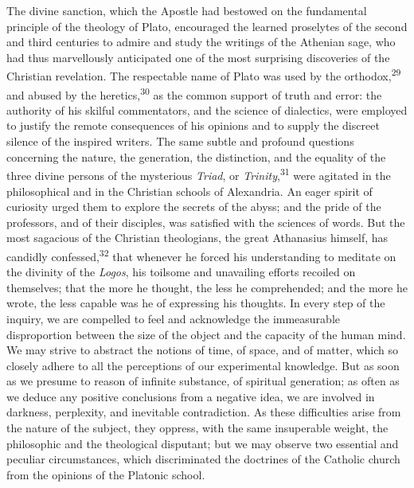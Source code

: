 The divine sanction, which the Apostle had bestowed on the
fundamental principle of the theology of Plato, encouraged the
learned proselytes of the second and third centuries to admire
and study the writings of the Athenian sage, who had thus
marvellously anticipated one of the most surprising discoveries
of the Christian revelation. The respectable name of Plato was
used by the orthodox,\textsuperscript{29} and abused by the heretics,\textsuperscript{30} as the
common support of truth and error: the authority of his skilful
commentators, and the science of dialectics, were employed to
justify the remote consequences of his opinions and to supply the
discreet silence of the inspired writers. The same subtle and
profound questions concerning the nature, the generation, the
distinction, and the equality of the three divine persons of the
mysterious \textit{Triad}, or \textit{Trinity},\textsuperscript{31} were agitated in the
philosophical and in the Christian schools of Alexandria. An
eager spirit of curiosity urged them to explore the secrets of
the abyss; and the pride of the professors, and of their
disciples, was satisfied with the sciences of words. But the most
sagacious of the Christian theologians, the great Athanasius
himself, has candidly confessed,\textsuperscript{32} that whenever he forced his
understanding to meditate on the divinity of the \textit{Logos}, his
toilsome and unavailing efforts recoiled on themselves; that the
more he thought, the less he comprehended; and the more he wrote,
the less capable was he of expressing his thoughts. In every step
of the inquiry, we are compelled to feel and acknowledge the
immeasurable disproportion between the size of the object and the
capacity of the human mind. We may strive to abstract the notions
of time, of space, and of matter, which so closely adhere to all
the perceptions of our experimental knowledge. But as soon as we
presume to reason of infinite substance, of spiritual generation;
as often as we deduce any positive conclusions from a negative
idea, we are involved in darkness, perplexity, and inevitable
contradiction. As these difficulties arise from the nature of the
subject, they oppress, with the same insuperable weight, the
philosophic and the theological disputant; but we may observe two
essential and peculiar circumstances, which discriminated the
doctrines of the Catholic church from the opinions of the
Platonic school.


